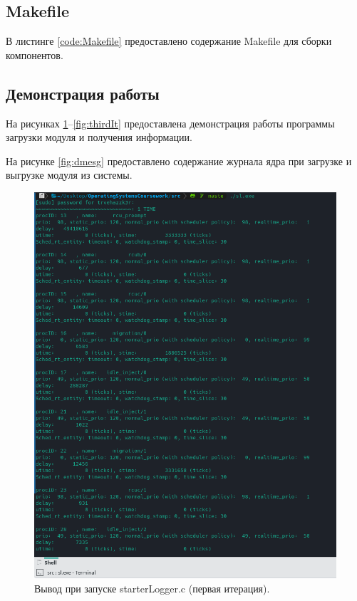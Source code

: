\subsection{Makefile}
В листинге \ref{code:Makefile} предоставлено содержание Makefile для сборки компонентов.

\newpage
{}

\subsection{Демонстрация работы}
На рисунках \ref{fig:firstIt}--\ref{fig:thirdIt} предоставлена демонстрация работы программы загрузки модуля и получения информации.

На рисунке \ref{fig:dmesg} предоставлено содержание журнала ядра при загрузке и выгрузке модуля из системы.

\begin{figure}[H]
	\centering
	\includegraphics[scale=0.8]{img/firstIt.png}
	\caption{Вывод при запуске starterLogger.c (первая итерация). }
	\label{fig:firstIt}
\end{figure}

